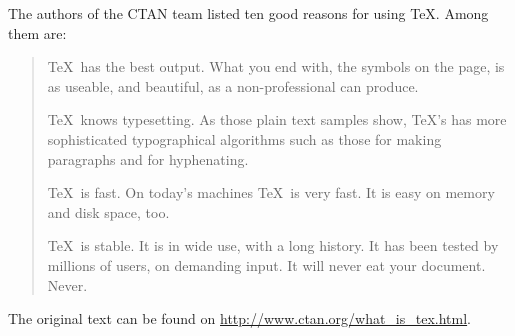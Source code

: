 \documentclass{article}
\begin{document}
The authors of the CTAN team listed ten good reasons
for using \TeX. Among them are:
\begin{quotation}
  \TeX\ has the best output. What you end with,
  the symbols on the page, is as useable, and beautiful,
  as a non-professional can produce.
  
  \TeX\ knows typesetting. As those plain text samples
  show, \TeX's has more sophisticated typographical algorithms
  such as those for making paragraphs and for hyphenating.
  
  \TeX\ is fast. On today's machines \TeX\ is very fast.
  It is easy on memory and disk space, too.
  
  \TeX\ is stable. It is in wide use, with a long history.
  It has been tested by millions of users, on demanding input.
  It will never eat your document. Never.
\end{quotation}
The original text can be found on
\url{ http://www.ctan.org/what_is_tex.html}.
\end{document}
